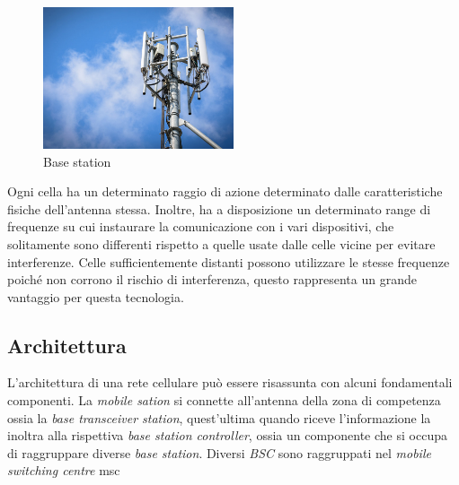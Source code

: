 \begin{figure}[h]
    \centering
    \includegraphics[width=0.5\textwidth]{images/base-station.jpg}
    \caption{Base station}
\end{figure}
Ogni cella ha un determinato raggio di azione determinato dalle caratteristiche fisiche dell'antenna stessa. Inoltre, 
ha a disposizione un determinato range di frequenze su cui instaurare la comunicazione con i vari dispositivi, che solitamente
sono differenti rispetto a quelle usate dalle celle vicine per evitare interferenze.
Celle sufficientemente distanti possono utilizzare le stesse frequenze poiché non corrono il rischio di interferenza, questo rappresenta
un grande vantaggio per questa tecnologia.

\subsection{Architettura}
L'architettura di una rete cellulare può essere risassunta con alcuni fondamentali componenti. La \textit{mobile sation} si connette all'antenna
della zona di competenza ossia la \textit{base transceiver station}, quest'ultima quando riceve l'informazione la inoltra alla rispettiva \textit{base station controller}, ossia
un componente che si occupa di raggruppare diverse \textit{base station}. 
Diversi \textit{BSC} sono raggruppati nel \textit{mobile switching centre} \gls{msc}